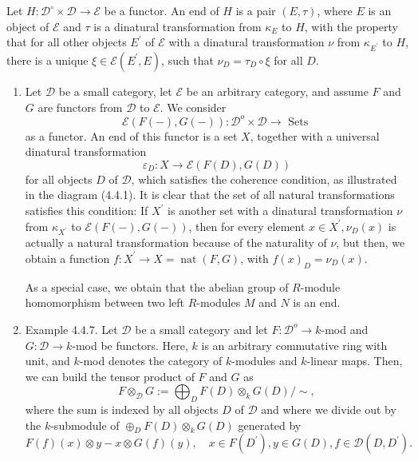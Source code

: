 Let $H: \mathcal{D}^{\circ} \times \mathcal{D} \rightarrow \mathcal{E}$ be a functor. An end of $H$ is a pair $(E, \tau)$, where $E$ is an object of $\mathcal{E}$ and $\tau$ is a dinatural transformation from $\kappa_E$ to $H$, with the property that for all other objects $E^{\prime}$ of $\mathcal{E}$ with a dinatural transformation $\nu$ from $\kappa_{E^{\prime}}$ to $H$, there is a unique $\xi \in \mathcal{E}\left(E^{\prime}, E\right)$, such that $\nu_D=\tau_D \circ \xi$ for all $D$.

\begin{example}\begin{enumerate}
    \item Let $\mathcal{D}$ be a small category, let $\mathcal{E}$ be an arbitrary category, and assume $F$ and $G$ are functors from $\mathcal{D}$ to $\mathcal{E}$. We consider
        $$
        \mathcal{E}(F(-), G(-)): \mathcal{D}^o \times \mathcal{D} \rightarrow \text { Sets }
        $$
        as a functor. An end of this functor is a set $X$, together with a universal dinatural transformation
        $$
        \varepsilon_D: X \rightarrow \mathcal{E}(F(D), G(D))
        $$
        for all objects $D$ of $\mathcal{D}$, which satisfies the coherence condition, as illustrated in the diagram (4.4.1). It is clear that the set of all natural transformations satisfies this condition: If $X^{\prime}$ is another set with a dinatural transformation $\nu$ from $\kappa_{X^{\prime}}$ to $\mathcal{E}(F(-), G(-))$, then for every element $x \in X^{\prime}, \nu_D(x)$ is actually a natural transformation because of the naturality of $\nu$, but then, we obtain a function $f: X^{\prime} \rightarrow X=\operatorname{nat}(F, G)$, with $f(x)_D=\nu_D(x)$.
        
        As a special case, we obtain that the abelian group of $R$-module homomorphism between two left $R$-modules $M$ and $N$ is an end.   
        \item Example 4.4.7. Let $\mathcal{D}$ be a small category and let $F: \mathcal{D}^o \rightarrow k$-mod and $G: \mathcal{D} \rightarrow k$-mod be functors. Here, $k$ is an arbitrary commutative ring with unit, and $k$-mod denotes the category of $k$-modules and $k$-linear maps. Then, we can build the tensor product of $F$ and $G$ as
        $$
        F \otimes_{\mathcal{D}} G:=\bigoplus_D F(D) \otimes_k G(D) / \sim,
        $$
        where the sum is indexed by all objects $D$ of $\mathcal{D}$ and where we divide out by the $k$-submodule of $\oplus_D F(D) \otimes_k G(D)$ generated by
        $$
        F(f)(x) \otimes y-x \otimes G(f)(y), \quad x \in F\left(D^{\prime}\right), y \in G(D), f \in \mathcal{D}\left(D, D^{\prime}\right) .
        $$
        

\end{enumerate}
\end{example}
